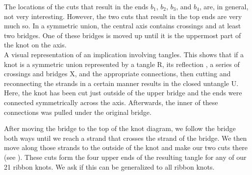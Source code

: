 \begin{paper}
The locations of the cuts that result in the ends $b_1$, $b_2$, $b_3$, and
$b_4$, are, in general, not very interesting.
However, the two cuts that result in the top ends are very much so.
In a symmetric union, the central axis contains crossings and at least two
bridges.
One of these bridges is moved up until it is the uppermost part of the knot on
the axis.\newsavebox{\knotR}\\

{A visual representation of an implication involving tangles.
This shows that if a knot is a symmetric union represented by a tangle R, its
reflection \usebox{\knotR}, a series of crossings and bridges X, and the
appropriate connections, then cutting and reconnecting the strands in a certain
manner results in the closed untangle U.
Here, the knot has been cut just outside of the upper bridge and the ends were
connected symmetrically across the axis.
Afterwards, the inner of these connections was pulled under the original
bridge.}

After moving the bridge to the top of the knot diagram, we follow the bridge
both ways until we reach a strand that crosses the strand of the bridge.
We then move along those strands to the outside of the knot and make our two
cuts there (see \figQuestion).
These cuts form the four upper ends of the resulting tangle for any of our 21
ribbon knots.
We ask if this can be generalized to all ribbon knots.


\end{paper}
